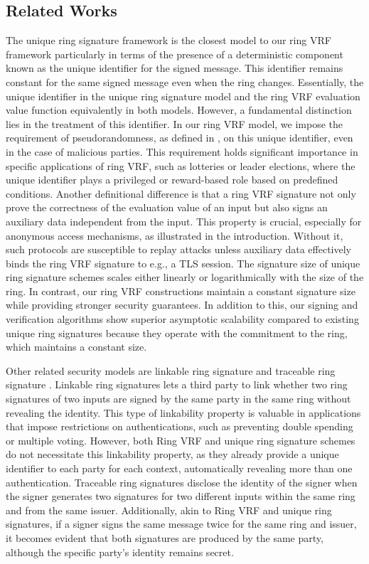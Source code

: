 \subsection{Related Works}


The unique ring signature framework \cite{URCframework} is the closest model to our ring VRF framework particularly in terms of the presence of a deterministic component known as the unique identifier for the signed message. This identifier remains constant for the same signed message even when the ring changes.  Essentially, the unique identifier in the unique ring signature model and the ring VRF evaluation value function equivalently in both models. However, a fundamental distinction lies in the treatment of this identifier. In our ring VRF model, we impose the requirement of pseudorandomness, as defined in \cite{ucvrf,praos}, on this unique identifier, even in the case of malicious parties. This requirement holds significant importance in specific applications of ring VRF, such as lotteries or leader elections, where the unique identifier plays a privileged or reward-based role based on predefined conditions. Another definitional difference is that a ring VRF  signature not only prove the correctness of the evaluation value of an input but also signs an auxiliary data independent from the input. This property is crucial, especially for anonymous access mechanisms, as illustrated in the introduction. Without it, such protocols are susceptible to replay attacks unless auxiliary data effectively binds the ring VRF signature to e.g., a TLS session.
The signature size of unique ring signature schemes scales either linearly \cite{URCframework,URCfc} or logarithmically  \cite{URCblockchainprivacy,URClattice} with the size of the ring. In contrast, our ring VRF constructions maintain a constant signature size while providing stronger security guarantees. In addition to this, our signing and verification algorithms show superior asymptotic scalability compared to existing unique ring signatures because they operate with the commitment to the ring, which maintains a constant size.

Other related security models are linkable ring signature \cite{ring_linkable,ring_linkablee} and traceable ring signature \cite{traceable07,traceable_sub}. Linkable ring signatures lets a third party to link whether two ring signatures of two inputs are signed by the same party in the same ring without revealing the identity. This type of linkability property is valuable in applications that impose restrictions on authentications, such as preventing double spending or multiple voting. However, both Ring VRF and unique ring signature schemes do not necessitate this linkability property, as they already provide a unique identifier to each party for each context, automatically revealing more than one authentication. Traceable ring signatures disclose the identity of the signer when the signer generates two signatures for two different inputs within the same ring and from the same issuer. Additionally, akin to Ring VRF and unique ring signatures, if a signer signs the same message twice for the same ring and issuer, it becomes evident that both signatures are produced by the same party, although the specific party's identity remains secret.
